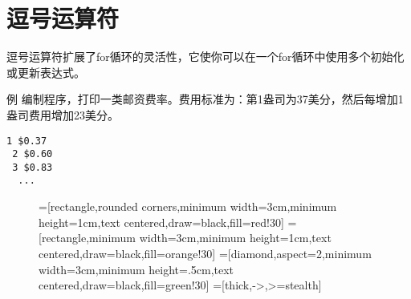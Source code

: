 \section{逗号运算符}
\begin{frame}[fragile]\ft{\secname}
逗号运算符扩展了for循环的灵活性，它使你可以在一个for循环中使用多个初始化或更新表达式。
\end{frame}

\begin{frame}[fragile]\ft{\secname}
\begin{block}{例}
编制程序，打印一类邮资费率。费用标准为：第1盎司为37美分，然后每增加1盎司费用增加23美分。
\end{block}
\end{frame}

\begin{frame}[fragile]\ft{\secname}
    
\end{frame}

\begin{frame}[fragile]\ft{\secname}
\begin{lstlisting}[backgroundcolor=\color{red!10}]
 1 $0.37
 2 $0.60
 3 $0.83
  ...
\end{lstlisting}
\end{frame}


\begin{frame}[fragile]\ft{\secname}
\begin{figure}
\centering
{}=[rectangle,rounded corners,minimum width=3cm,minimum height=1cm,text centered,draw=black,fill=red!30]
=[rectangle,minimum width=3cm,minimum height=1cm,text centered,draw=black,fill=orange!30]
=[diamond,aspect=2,minimum width=3cm,minimum height=.5cm,text centered,draw=black,fill=green!30]
=[thick,->,>=stealth]


\end{figure}

\end{frame}


